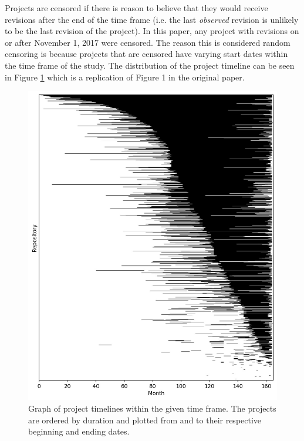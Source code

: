 \documentclass[acmconf]{acmart}
\begin{document}
Projects are censored if there is reason to believe that they would receive revisions after the end of the time frame (i.e. the last \emph{observed} revision is unlikely to be the last revision of the project).
In this paper, any project with revisions on or after November 1, 2017 were censored. 
The reason this is considered random censoring is because projects that are censored have varying start dates within the time frame of the study.
The distribution of the project timeline can be seen in Figure \ref{fig:figure-1} which is a replication of Figure 1 in the original paper.

\begin{figure}[h]
\centering
\includegraphics[scale=0.5]{figure1.jpg}
\Description{}
\caption{Graph of project timelines within the given time frame. The projects are ordered by duration and plotted from and to their respective beginning and ending dates.}
\label{fig:figure-1}
\end{figure}
\end{document}
